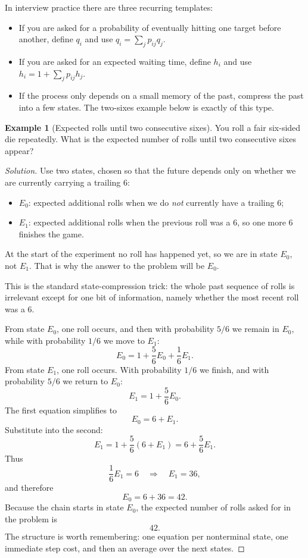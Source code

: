 \documentclass[11pt]{article}
\theoremstyle{definition}
\newtheorem{example}{Example}[section]
\begin{document}
In interview practice there are three recurring templates:
\begin{itemize}
    \item If you are asked for a probability of eventually hitting one target before another, define $q_i$ and use $q_i=\sum_j p_{ij}q_j$.
    \item If you are asked for an expected waiting time, define $h_i$ and use $h_i=1+\sum_j p_{ij}h_j$.
    \item If the process only depends on a small memory of the past, compress the past into a few states. The two-sixes example below is exactly of this type.
\end{itemize}

\begin{example}[Expected rolls until two consecutive sixes]
You roll a fair six-sided die repeatedly. What is the expected number of rolls until two consecutive sixes appear?
\end{example}

\begin{proof}[Solution]
Use two states, chosen so that the future depends only on whether we are currently carrying a trailing $6$:
\begin{itemize}
    \item $E_0$: expected additional rolls when we do \emph{not} currently have a trailing $6$;
    \item $E_1$: expected additional rolls when the previous roll was a $6$, so one more $6$ finishes the game.
\end{itemize}
At the start of the experiment no roll has happened yet, so we are in state $E_0$, not $E_1$. That is why the answer to the problem will be $E_0$.

This is the standard state-compression trick: the whole past sequence of rolls is irrelevant except for one bit of information, namely whether the most recent roll was a $6$.

From state $E_0$, one roll occurs, and then with probability $5/6$ we remain in $E_0$, while with probability $1/6$ we move to $E_1$:
\[
E_0 = 1 + \frac{5}{6}E_0 + \frac{1}{6}E_1.
\]
From state $E_1$, one roll occurs. With probability $1/6$ we finish, and with probability $5/6$ we return to $E_0$:
\[
E_1 = 1 + \frac{5}{6}E_0.
\]
The first equation simplifies to
\[
E_0 = 6 + E_1.
\]
Substitute into the second:
\[
E_1 = 1 + \frac{5}{6}(6+E_1)=6+\frac{5}{6}E_1.
\]
Thus
\[
\frac{1}{6}E_1=6 \quad \Longrightarrow \quad E_1=36,
\]
and therefore
\[
E_0=6+36=42.
\]
Because the chain starts in state $E_0$, the expected number of rolls asked for in the problem is
\[
\boxed{42}.
\]
The structure is worth remembering: one equation per nonterminal state, one immediate step cost, and then an average over the next states.
\end{proof}
\end{document}
